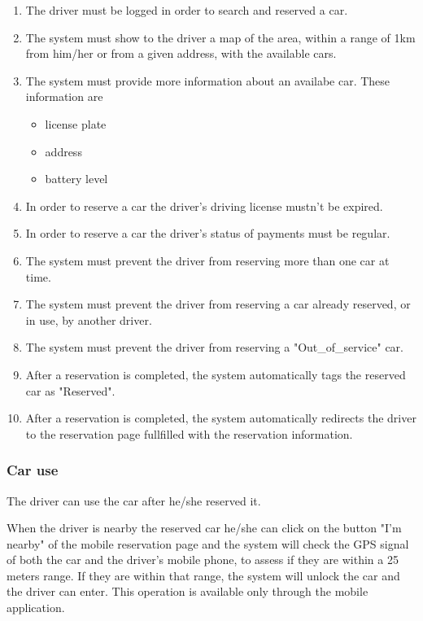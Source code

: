 \begin{enumerate}
	\item The driver must be logged in order to search and reserved a car.
	\item The system must show to the driver a map of the area, within a range of 1km from him/her or from a given address, with the available cars.
	\item The system must provide more information about an availabe car. These information are
		\begin{itemize}
			\item license plate
			\item address
			\item battery level
		\end{itemize}
	\item In order to reserve a car the driver's driving license mustn't be expired. \label{f-expired}
	\item In order to reserve a car the driver's status of payments must be regular. \label{f-regular}
	\item The system must prevent the driver from reserving more than one car at time.
	\item The system must prevent the driver from reserving a car already reserved, or in use, by another driver.
	\item The system must prevent the driver from reserving a "Out\_of\_service" car.
	\item After a reservation is completed, the system automatically tags the reserved car as "Reserved".
	\item After a reservation is completed, the system automatically redirects the driver to the reservation page fullfilled with the reservation information.
\end{enumerate}

\subsubsection{Car use}

The driver can use the car after he/she reserved it.

When the driver is nearby the reserved car he/she can click on the button "I'm nearby" of the mobile reservation page and the system will check the GPS signal of both the car and the driver's mobile phone, to assess if they are within a 25 meters range. If they are within that range, the system will unlock the car and the driver can enter. This operation is available only through the mobile application.

